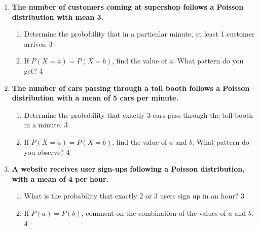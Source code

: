 \documentclass[a4paper,oneside, margin=1.4in]{book}
\begin{document}
\begin{enumerate}
  \begin{enumerate}
    \item
	When is Poisson variate applicable? \hfill 1
    \item
	Show conversion criteria and method from Binomial to Poisson distribution. \hfill 2
    \item  
	Find the probability of receiving no more than 3 calls. \hfill 3
    \item
	Find the pattern of calls and show on graph paper.  \hfill 4 \\
	Hint: Find probabilities: P(0), P(1), $\cdots$
  \end{enumerate}
  
   \item
	  \textbf{The number of customers coming at supershop follows a Poisson 
	  distribution with mean 3.} 
  
  \begin{enumerate}
    \item  
	Determine the probability that in a particular minute, at least 1 customer 
	arrives. \hfill 3
    \item
	If $P(X = a) = P(X= b)$, find the value of $a$. What pattern do you get?
	\hfill 4
  \end{enumerate}
  
  \item
	  \textbf{The number of cars passing through a toll booth follows a 
	  Poisson distribution with a mean of 5 cars per minute.} 
  
  \begin{enumerate}
    \item  
	Determine the probability that exactly 3 cars pass through the toll 
	booth in a minute. \hfill 3
    \item
	If $P(X = a) = P(X = b)$, find the value of $a$ and $b$. What pattern do 
	you observe? \hfill 4
  \end{enumerate}
  
  \item
  \textbf{A website receives user sign-ups following a Poisson distribution, with a mean of 4 per hour.}  
  
  \begin{enumerate}
    \item  
      What is the probability that exactly 2 or 3 users sign up in an hour? \hfill 3  
    \item  
      If $P(a) = P(b)$, comment on the combination of the values of $a$ and $b$. \hfill 4  
  \end{enumerate}



\end{enumerate}
\end{document}
